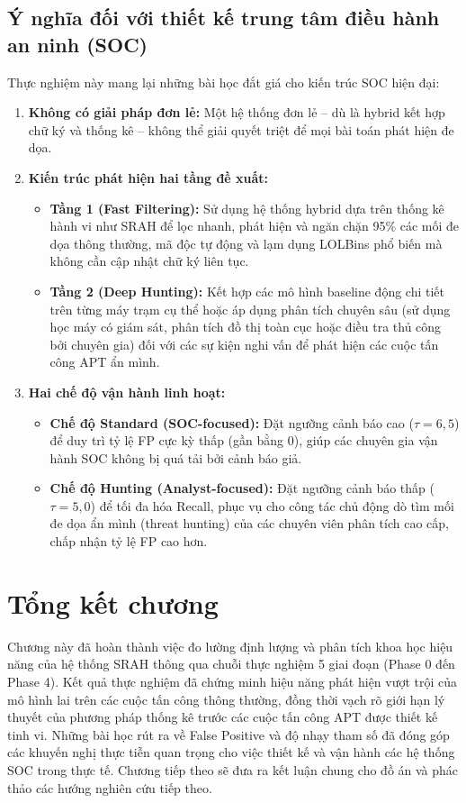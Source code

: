 \documentclass[../main.tex]{subfiles}
\begin{document}
\subsection{Ý nghĩa đối với thiết kế trung tâm điều hành an ninh (SOC)}
Thực nghiệm này mang lại những bài học đắt giá cho kiến trúc SOC hiện đại:
\begin{enumerate}
    \item \textbf{Không có giải pháp đơn lẻ:} Một hệ thống đơn lẻ – dù là hybrid kết hợp chữ ký và thống kê – không thể giải quyết triệt để mọi bài toán phát hiện đe dọa.
    \item \textbf{Kiến trúc phát hiện hai tầng đề xuất:}
    \begin{itemize}
        \item \textbf{Tầng 1 (Fast Filtering):} Sử dụng hệ thống hybrid dựa trên thống kê hành vi như SRAH để lọc nhanh, phát hiện và ngăn chặn 95\% các mối đe dọa thông thường, mã độc tự động và lạm dụng LOLBins phổ biến mà không cần cập nhật chữ ký liên tục.
        \item \textbf{Tầng 2 (Deep Hunting):} Kết hợp các mô hình baseline động chi tiết trên từng máy trạm cụ thể hoặc áp dụng phân tích chuyên sâu (sử dụng học máy có giám sát, phân tích đồ thị toàn cục hoặc điều tra thủ công bởi chuyên gia) đối với các sự kiện nghi vấn để phát hiện các cuộc tấn công APT ẩn mình.
    \end{itemize}
    \item \textbf{Hai chế độ vận hành linh hoạt:}
    \begin{itemize}
        \item \textbf{Chế độ Standard (SOC-focused):} Đặt ngưỡng cảnh báo cao ($\tau = 6,5$) để duy trì tỷ lệ FP cực kỳ thấp (gần bằng 0), giúp các chuyên gia vận hành SOC không bị quá tải bởi cảnh báo giả.
        \item \textbf{Chế độ Hunting (Analyst-focused):} Đặt ngưỡng cảnh báo thấp ($\tau = 5,0$) để tối đa hóa Recall, phục vụ cho công tác chủ động dò tìm mối đe dọa ẩn mình (threat hunting) của các chuyên viên phân tích cao cấp, chấp nhận tỷ lệ FP cao hơn.
    \end{itemize}
\end{enumerate}

\section{Tổng kết chương}
\label{section:3.7}

Chương này đã hoàn thành việc đo lường định lượng và phân tích khoa học hiệu năng của hệ thống SRAH thông qua chuỗi thực nghiệm 5 giai đoạn (Phase 0 đến Phase 4). Kết quả thực nghiệm đã chứng minh hiệu năng phát hiện vượt trội của mô hình lai trên các cuộc tấn công thông thường, đồng thời vạch rõ giới hạn lý thuyết của phương pháp thống kê trước các cuộc tấn công APT được thiết kế tinh vi. Những bài học rút ra về False Positive và độ nhạy tham số đã đóng góp các khuyến nghị thực tiễn quan trọng cho việc thiết kế và vận hành các hệ thống SOC trong thực tế. Chương tiếp theo sẽ đưa ra kết luận chung cho đồ án và phác thảo các hướng nghiên cứu tiếp theo.
\end{document}
